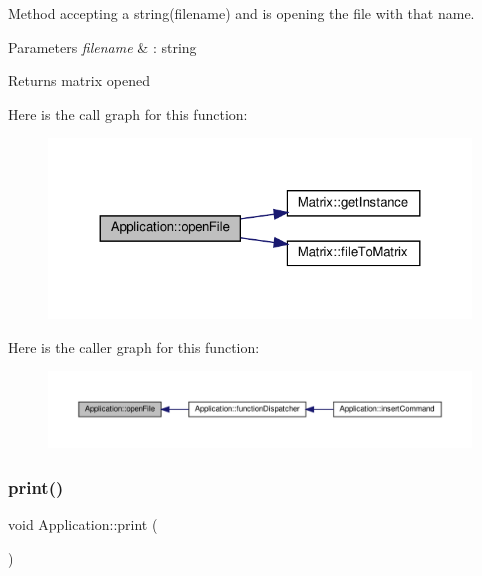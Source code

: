 Method accepting a string(filename) and is opening the file with that name. 
\begin{DoxyParams}{Parameters}
{\em filename} & \+: string \\
\hline
\end{DoxyParams}
\begin{DoxyReturn}{Returns}
matrix opened 
\end{DoxyReturn}
Here is the call graph for this function\+:
\nopagebreak
\begin{figure}[H]
\begin{center}
\leavevmode
\includegraphics[width=324pt]{class_application_ab2f161414a4e2f16e28321c192051006_cgraph}
\end{center}
\end{figure}
Here is the caller graph for this function\+:
\nopagebreak
\begin{figure}[H]
\begin{center}
\leavevmode
\includegraphics[width=350pt]{class_application_ab2f161414a4e2f16e28321c192051006_icgraph}
\end{center}
\end{figure}
\mbox{\label{class_application_a2bc1937440cb9e71dace95c3fe7ed4ea}} 
\subsubsection{\texorpdfstring{print()}{print()}}
{\footnotesize\ttfamily void Application\+::print (\begin{DoxyParamCaption}{ }\end{DoxyParamCaption})\hspace{0.3cm}{\ttfamily [private]}}

